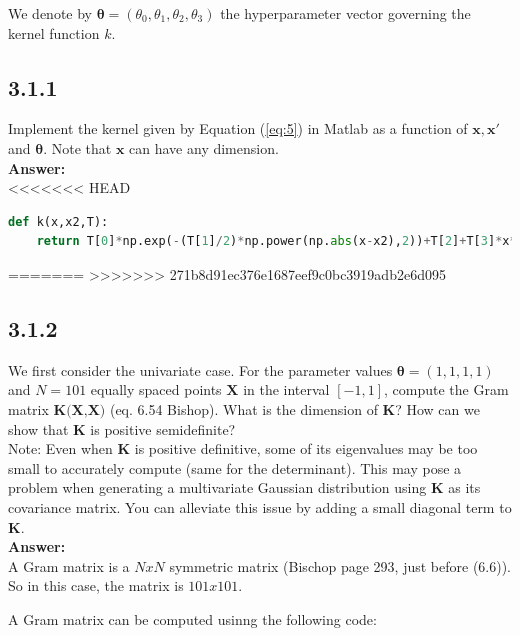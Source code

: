 \documentclass[a4paper]{article}
\begin{document}
We denote by $\boldsymbol{\theta}  = (\theta_0, \theta_1, \theta_2, \theta_3)$ the hyperparameter vector governing the kernel function $k$.

\subsection*{3.1.1}

Implement the kernel given by Equation (\ref{eq:5}) in Matlab as a function of $\textbf{x}, \textbf{x}'$ and $\boldsymbol{\theta}$. Note that $\textbf{x}$ can have any dimension.\\

\textbf{Answer:}\\


<<<<<<< HEAD
\begin{lstlisting}[language=Python]
def k(x,x2,T):
    return T[0]*np.exp(-(T[1]/2)*np.power(np.abs(x-x2),2))+T[2]+T[3]*x*x2
\end{lstlisting}
=======
>>>>>>> 271b8d91ec376e1687eef9c0bc3919adb2e6d095



\subsection*{3.1.2}

We first consider the univariate case. For the parameter values $\boldsymbol{\theta} = (1,1,1,1)$ and $N = 101$ equally spaced points $\textbf{X}$ in the interval $[-1,1]$, compute the Gram matrix $\textbf{K(X,X)}$ (eq. 6.54 Bishop). What is the dimension of \textbf{K}? How can we show that \textbf{K} is positive semidefinite?\\



Note: Even when \textbf{K} is positive definitive, some of its eigenvalues may be too small to accurately compute (same for the determinant). This may pose a problem when generating a multivariate Gaussian distribution using \textbf{K} as its covariance matrix. You can alleviate this issue by adding a small diagonal term to \textbf{K}.\\


\textbf{Answer:}\\



A Gram matrix is a $N x N$ symmetric matrix (Bischop page 293, just before (6.6)). So in this case, the matrix is $101 x 101$.

A Gram matrix can be computed usinng the following code:
\end{document}
